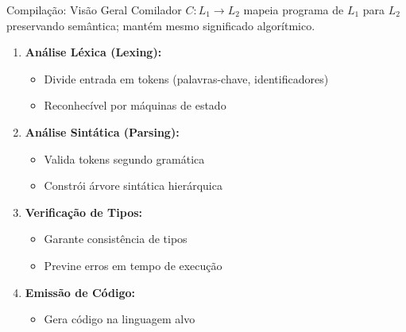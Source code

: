 \begin{frame}{Compilação: Visão Geral}
    Comilador $C: L_1 \rightarrow L_2$ mapeia programa de $L_1$ para $L_2$ preservando semântica; mantém mesmo significado algorítmico.

    \begin{enumerate}

        \item \textbf{Análise Léxica (Lexing):}
              \begin{itemize}
                  \item Divide entrada em tokens (palavras-chave, identificadores)
                  \item Reconhecível por máquinas de estado
              \end{itemize}
        \item \textbf{Análise Sintática (Parsing):}
              \begin{itemize}
                  \item Valida tokens segundo gramática
                  \item Constrói árvore sintática hierárquica
              \end{itemize}
        \item \textbf{Verificação de Tipos:}
              \begin{itemize}
                  \item Garante consistência de tipos
                  \item Previne erros em tempo de execução
              \end{itemize}
        \item \textbf{Emissão de Código:}
              \begin{itemize}
                  \item Gera código na linguagem alvo
              \end{itemize}
    \end{enumerate}
\end{frame}

